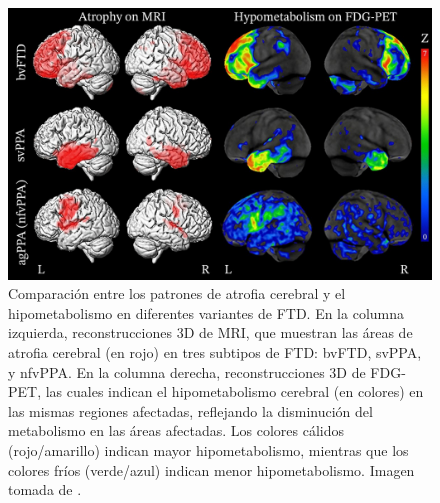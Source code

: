 \begin{figure}[h]
	\centering
	\includegraphics[width=0.75\linewidth]{figures/introduction/differences.jpg}
	\caption{Comparación entre los patrones de atrofia cerebral y el hipometabolismo en diferentes variantes de FTD. En la columna izquierda, reconstrucciones 3D de MRI, que muestran las áreas de atrofia cerebral (en rojo) en tres subtipos de FTD: bvFTD, svPPA, y nfvPPA. En la columna derecha, reconstrucciones 3D de FDG-PET, las cuales indican el hipometabolismo cerebral (en colores) en las mismas regiones afectadas, reflejando la disminución del metabolismo en las áreas afectadas. Los colores cálidos (rojo/amarillo) indican mayor hipometabolismo, mientras que los colores fríos (verde/azul) indican menor hipometabolismo. Imagen tomada de \cite{peet2021neuroimaging}.}
	\label{fig:comparacion_imagenes_diagnostico}
\end{figure}

